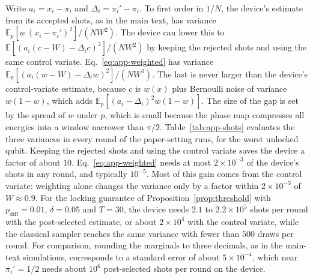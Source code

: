 Write $a_i=x_i-\pi_i$ and $\Delta_i=\pi_i'-\pi_i$. To first order in $1/N$, the device's estimate from its accepted shots, as in the main text, has variance $\mathbb{E}_p[w\,(x_i-\pi_i')^2]/(NW^2)$. The device can lower this to $\mathbb{E}[(a_i(c-W)-\Delta_ic)^2]/(NW^2)$ by keeping the rejected shots and using the same control variate. Eq.~\eqref{eq:app-weighted} has variance $\mathbb{E}_p[(a_i(w-W)-\Delta_iw)^2]/(NW^2)$. The last is never larger than the device's control-variate estimate, because $c$ is $w(x)$ plus Bernoulli noise of variance $w(1-w)$, which adds $\mathbb{E}_p[(a_i-\Delta_i)^2w(1-w)]$. The size of the gap is set by the spread of $w$ under $p$, which is small because the phase map compresses all energies into a window narrower than $\pi/2$. Table~\ref{tab:app-shots} evaluates the three variances in every round of the paper-setting runs, for the worst unlocked qubit. Keeping the rejected shots and using the control variate saves the device a factor of about $10$. Eq.~\eqref{eq:app-weighted} needs at most $2\times10^{-3}$ of the device's shots in any round, and typically $10^{-5}$. Most of this gain comes from the control variate: weighting alone changes the variance only by a factor within $2\times10^{-3}$ of $W\approx0.9$. For the locking guarantee of Proposition~\ref{prop:threshold} with $p_{\mathrm{diff}}=0.01$, $\delta=0.05$ and $T=30$, the device needs $2.1$ to $2.2\times10^5$ shots per round with the post-selected estimate, or about $2\times10^4$ with the control variate, while the classical sampler reaches the same variance with fewer than $500$ draws per round. For comparison, rounding the marginals to three decimals, as in the main-text simulations, corresponds to a standard error of about $5\times10^{-4}$, which near $\pi_i'=1/2$ needs about $10^6$ post-selected shots per round on the device.

